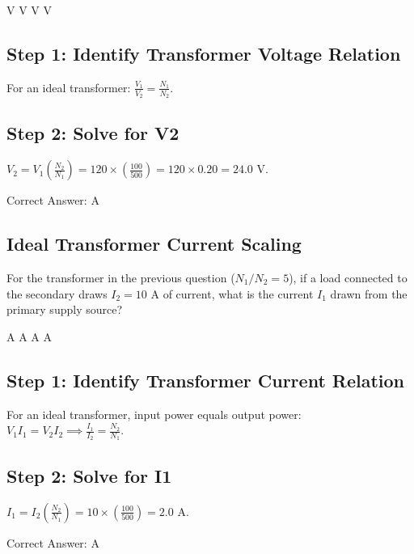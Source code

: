 \begin{choices}
     V
     V
     V
     V
\end{choices}

\begin{solution}

\subsection*{Step 1: Identify Transformer Voltage Relation}
For an ideal transformer: $\frac{V_1}{V_2} = \frac{N_1}{N_2}$.

\subsection*{Step 2: Solve for V2}
$V_2 = V_1 \left(\frac{N_2}{N_1}\right) = 120 \times \left(\frac{100}{500}\right) = 120 \times 0.20 = 24.0\text{ V}$.

Correct Answer: A
\end{solution}

\clearpage

\subsection{Ideal Transformer Current Scaling}

For the transformer in the previous question ($N_1/N_2 = 5$), if a load connected to the secondary draws $I_2 = 10\text{ A}$ of current, what is the current $I_1$ drawn from the primary supply source?

\begin{choices}
     A
     A
     A
     A
\end{choices}

\begin{solution}

\subsection*{Step 1: Identify Transformer Current Relation}
For an ideal transformer, input power equals output power: $V_1 I_1 = V_2 I_2 \implies \frac{I_1}{I_2} = \frac{N_2}{N_1}$.

\subsection*{Step 2: Solve for I1}
$I_1 = I_2 \left(\frac{N_2}{N_1}\right) = 10 \times \left(\frac{100}{500}\right) = 2.0\text{ A}$.

Correct Answer: A
\end{solution}

